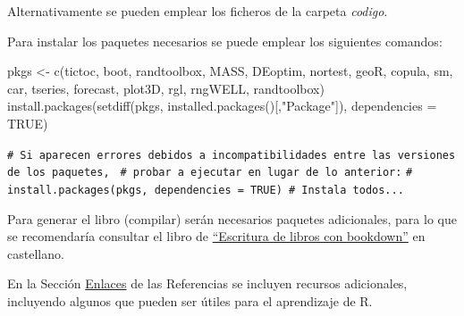 \documentclass[
]{book}
\newenvironment{Shaded}{\begin{snugshade}}{\end{snugshade}}
\newcommand{\AttributeTok}[1]{\textcolor[rgb]{0.77,0.63,0.00}{#1}}
\newcommand{\CommentTok}[1]{\textcolor[rgb]{0.56,0.35,0.01}{\textit{#1}}}
\newcommand{\ConstantTok}[1]{\textcolor[rgb]{0.00,0.00,0.00}{#1}}
\newcommand{\FunctionTok}[1]{\textcolor[rgb]{0.00,0.00,0.00}{#1}}
\newcommand{\NormalTok}[1]{#1}
\newcommand{\OtherTok}[1]{\textcolor[rgb]{0.56,0.35,0.01}{#1}}
\newcommand{\StringTok}[1]{\textcolor[rgb]{0.31,0.60,0.02}{#1}}
\theoremstyle{break}
\theoremstyle{nonumberplain}
\renewcommand{\CommentTok}[1]{\textcolor[rgb]{0.41,0.41,0.41}{\texttt{#1}}}
\begin{document}
Alternativamente se pueden emplear los ficheros de la carpeta \emph{codigo}.

Para instalar los paquetes necesarios se puede emplear los siguientes comandos:

\begin{Shaded}
\begin{Highlighting}[]
\NormalTok{pkgs }\OtherTok{\textless{}{-}} \FunctionTok{c}\NormalTok{(}\StringTok{\textquotesingle{}tictoc\textquotesingle{}}\NormalTok{, }\StringTok{\textquotesingle{}boot\textquotesingle{}}\NormalTok{, }\StringTok{\textquotesingle{}randtoolbox\textquotesingle{}}\NormalTok{, }\StringTok{\textquotesingle{}MASS\textquotesingle{}}\NormalTok{, }\StringTok{\textquotesingle{}DEoptim\textquotesingle{}}\NormalTok{, }\StringTok{\textquotesingle{}nortest\textquotesingle{}}\NormalTok{, }\StringTok{\textquotesingle{}geoR\textquotesingle{}}\NormalTok{, }\StringTok{\textquotesingle{}copula\textquotesingle{}}\NormalTok{,}
          \StringTok{\textquotesingle{}sm\textquotesingle{}}\NormalTok{, }\StringTok{\textquotesingle{}car\textquotesingle{}}\NormalTok{, }\StringTok{\textquotesingle{}tseries\textquotesingle{}}\NormalTok{, }\StringTok{\textquotesingle{}forecast\textquotesingle{}}\NormalTok{, }\StringTok{\textquotesingle{}plot3D\textquotesingle{}}\NormalTok{, }\StringTok{\textquotesingle{}rgl\textquotesingle{}}\NormalTok{, }\StringTok{\textquotesingle{}rngWELL\textquotesingle{}}\NormalTok{, }\StringTok{\textquotesingle{}randtoolbox\textquotesingle{}}\NormalTok{)}
\FunctionTok{install.packages}\NormalTok{(}\FunctionTok{setdiff}\NormalTok{(pkgs, }\FunctionTok{installed.packages}\NormalTok{()[,}\StringTok{"Package"}\NormalTok{]), }
                 \AttributeTok{dependencies =} \ConstantTok{TRUE}\NormalTok{)}

\CommentTok{\# Si aparecen errores debidos a incompatibilidades entre las versiones de los paquetes, }
\CommentTok{\# probar a ejecutar en lugar de lo anterior:}
\CommentTok{\# install.packages(pkgs, dependencies = TRUE) \# Instala todos...}
\end{Highlighting}
\end{Shaded}

Para generar el libro (compilar) serán necesarios paquetes adicionales,
para lo que se recomendaría consultar el libro de \href{https://rubenfcasal.github.io/bookdown_intro}{``Escritura de libros con bookdown''} en castellano.

En la Sección \protect\hyperlink{links}{Enlaces} de las Referencias se incluyen recursos adicionales, incluyendo algunos que pueden ser útiles para el aprendizaje de R.
\end{document}
